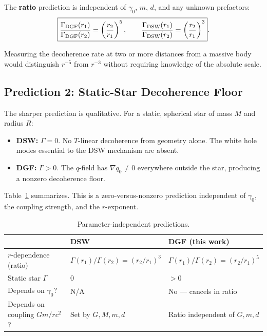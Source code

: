 \documentclass[aps,prl,twocolumn,showpacs,superscriptaddress,preprintnumbers]{revtex4-2}
\begin{document}
The \textbf{ratio} prediction is independent of $\gamma_0$, $m$, $d$, and any unknown prefactors:
\begin{equation}
\boxed{\frac{\Gamma_{\rm DGF}(r_1)}{\Gamma_{\rm DGF}(r_2)}
= \left(\frac{r_2}{r_1}\right)^{5}, \qquad
\frac{\Gamma_{\rm DSW}(r_1)}{\Gamma_{\rm DSW}(r_2)}
= \left(\frac{r_2}{r_1}\right)^{3}}.
\label{eq:ratio}
\end{equation}

Measuring the decoherence rate at two or more distances from a massive body would distinguish $r^{-5}$ from $r^{-3}$ without requiring knowledge of the absolute scale.

\subsection{Prediction 2: Static-Star Decoherence Floor}

The sharper prediction is qualitative.
For a static, spherical star of mass $M$ and radius $R$:

\begin{itemize}
    \item \textbf{DSW:} $\Gamma=0$. No $T$-linear decoherence from geometry alone. The white hole modes essential to the DSW mechanism are absent.
    \item \textbf{DGF:} $\Gamma>0$. The $q$-field has $\nabla q_0\neq0$ everywhere outside the star, producing a nonzero decoherence floor.
\end{itemize}

Table~\ref{tab:compare} summarizes.
This is a zero-versus-nonzero prediction independent of $\gamma_0$, the coupling strength, and the $r$-exponent.

\begin{table}[h]
\centering
\caption{Parameter-independent predictions.}
\label{tab:compare}
\begin{tabular}{p{}p{}p{}}
\toprule
& \textbf{DSW} & \textbf{DGF (this work)} \\
\midrule
$r$-dependence (ratio)
& $\Gamma(r_1)/\Gamma(r_2) = (r_2/r_1)^3$
& $\Gamma(r_1)/\Gamma(r_2) = (r_2/r_1)^5$ \\
\hline
Static star $\Gamma$
& $0$
& $>0$ \\
\hline
Depends on $\gamma_0$?
& N/A
& No --- cancels in ratio \\
\hline
Depends on coupling $Gm/rc^2$?
& Set by $G,M,m,d$
& Ratio independent of $G,m,d$ \\
\bottomrule
\end{tabular}
\end{table}
\end{document}
